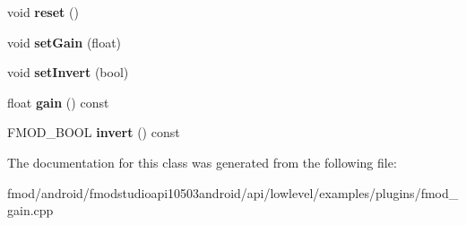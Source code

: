 \begin{DoxyCompactItemize}
\item 
\hypertarget{class_f_m_o_d_gain_state_a073e3755bebb99a7a49d570f47b2c39c}{void {\bfseries reset} ()}\label{class_f_m_o_d_gain_state_a073e3755bebb99a7a49d570f47b2c39c}

\item 
\hypertarget{class_f_m_o_d_gain_state_a97c3c310c9d8147bed3e06a9425117e2}{void {\bfseries set\+Gain} (float)}\label{class_f_m_o_d_gain_state_a97c3c310c9d8147bed3e06a9425117e2}

\item 
\hypertarget{class_f_m_o_d_gain_state_a03247336c400f9e34116aa0e3cf2c87c}{void {\bfseries set\+Invert} (bool)}\label{class_f_m_o_d_gain_state_a03247336c400f9e34116aa0e3cf2c87c}

\item 
\hypertarget{class_f_m_o_d_gain_state_a9545e8c89d8fe048b8648937fa7d3535}{float {\bfseries gain} () const }\label{class_f_m_o_d_gain_state_a9545e8c89d8fe048b8648937fa7d3535}

\item 
\hypertarget{class_f_m_o_d_gain_state_a7ee6a09a04c1a2ad4d80433480d1db85}{F\+M\+O\+D\+\_\+\+B\+O\+O\+L {\bfseries invert} () const }\label{class_f_m_o_d_gain_state_a7ee6a09a04c1a2ad4d80433480d1db85}

\end{DoxyCompactItemize}


The documentation for this class was generated from the following file\+:\begin{DoxyCompactItemize}
\item 
fmod/android/fmodstudioapi10503android/api/lowlevel/examples/plugins/fmod\+\_\+gain.\+cpp\end{DoxyCompactItemize}
